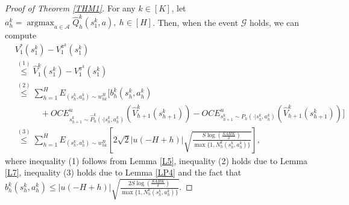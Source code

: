 \documentclass[11pt]{article}
\newcommand{\1}{\mathbbm{1}}
\begin{document}
\begin{proof}[Proof of Theorem \ref{THM1}]
For any $k\in [K]$, let $a_h^k=\mathop{\arg\max}_{a\in\mathcal{A}}\hat{Q}^k_h(s_1^k,a),\ h\in [H]$. Then, when the event $\mathcal{G}$ holds, we can compute
\begin{align}
&V^*_1(s_1^k)-V_1^{\pi^k}(s_1^k) \nonumber \\
&\overset{(1)}{\leq} \hat{V}_1^k(s_1^k)-V_1^{\pi^k}(s_1^k) \nonumber \\
&\overset{(2)}{\leq} \sum_{h=1}^H E_{(s_h^k,a_h^k)\sim w_{hk}^{B}}\Big [b^k_h(s_h^k,a_h^k)\nonumber\\
&\quad \quad \quad +OCE^u_{s_{h+1}^k\sim \hat{P}^k_h(\cdot\vert s_h^k,a_h^k)}(\hat{V}_{h+1}^k(s_{h+1}^k))-OCE^u_{s_{h+1}^k\sim P_h(\cdot\vert s_h^k,a_h^k)}(\hat{V}_{h+1}^k(s_{h+1}^k))\Big ] \nonumber \\
&\overset{(3)}{\leq}  \sum_{h=1}^H E_{(s_h^k,a_h^k)\sim w_{hk}^{B}}\left [2\sqrt{2} \vert u(-H+h)\vert\sqrt{\frac{S\log\left (\frac{SAHK}{\delta}\right )}{\max\{1,N_h^k(s_h^k,a_h^k)\}}} \right ],  \label{eq:highPbound}
\end{align}
where inequality (1) follows from Lemma \ref{L5}, inequality (2) holds due to Lemma \ref{L7}, inequality (3) holds due to Lemma \ref{LP4} and the fact that $b^k_h(s_h^k,a_h^k)\leq \vert u(-H+h)\vert\sqrt{\frac{2S\log\left (\frac{SAHK}{\delta}\right )}{\max\{1,N_h^k(s_h^k,a_h^k)\}}}$.



\end{proof}
\end{document}
